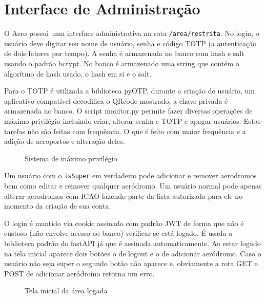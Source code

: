 \chapter{Interface de Administração}

O Aero possui uma interface administrativa na rota \verb|/area/restrita|. No login,
o usuário deve digitar seu nome de usuário, senha e código TOTP (a autenticação
de dois fatores por tempo). A senha é armazenada no banco com hash e salt usando 
o padrão bcrypt. No banco é armazenado uma string que contém o algorítmo de hash
usado, o hash em si e o salt. 

Para o TOTP é utilizada a biblioteca pyOTP, durante a criação de usuário, um 
aplicativo compatível decodifica o QRcode mostrado, a chave privada é armazenada 
no banco. O script monitor.py permite fazer diversas operações de máximo privilégio 
incluindo criar, alterar senha e TOTP e apagar usuários. Estas tarefas não são 
feitas com frequência. O que é feito com maior frequência e a adição de aeroportos 
e alteração deles.

\begin{figure}[ht]
    \begin{center}
    
    \caption{Sistema de máximo privilégio}
    \label{fig:max-priv-sys}
    \end{center}
\end{figure}

Um usuário com o \verb|isSuper| em verdadeiro pode adicionar e remover aerodromos 
bem como editar e remover qualquer aeródromo. Um usuário normal pode apenas alterar 
aerodromos com ICAO fazendo parte da lista autorizada para ele no momento da criação
de sua conta.

O login é mantido via cookie assinado com padrão JWT de forma que não é custoso 
(não envolve acesso ao banco) verificar se está logado. É usada a biblioteca padrão 
do fastAPI já que é assinada automaticamente.
Ao estar logado na tela inicial aparece dois botões o de logout e o de adicionar 
aeródromo. Caso o usuário não seja super o segundo botão não aparece e, obviamente 
a rota GET e POST de adicionar aeródromo retorna um erro.

\begin{figure}[ht]
    \begin{center}
    
    \caption{Tela inicial da área logada}
    \label{fig:max-priv-sys}
    \end{center}
\end{figure}

